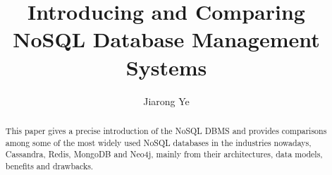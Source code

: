 \documentclass[sigconf]{acmart}
\begin{document}
\title{Introducing and Comparing NoSQL Database Management Systems}


\author{Jiarong Ye}




\begin{abstract}
	 This paper gives a precise introduction of the
	NoSQL DBMS and provides comparisons among some of the most widely used NoSQL databases
	in the industries nowadays, Cassandra, Redis, MongoDB and Neo4j, mainly from their architectures, data models, benefits and drawbacks.
	
\end{abstract}


%






\maketitle





\end{document}

